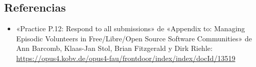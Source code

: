 \hypertarget{referencias}{%
\subsection{Referencias}\label{referencias}}

\begin{itemize}
\tightlist
\item
  «Practice P.12: Respond to all submissions» de «Appendix to: Managing
  Episodic Volunteers in Free/Libre/Open Source Software Communities» de
  Ann Barcomb, Klaas-Jan Stol, Brian Fitzgerald y Dirk Riehle:
  \url{https://opus4.kobv.de/opus4-fau/frontdoor/index/index/docId/13519}
\end{itemize}

